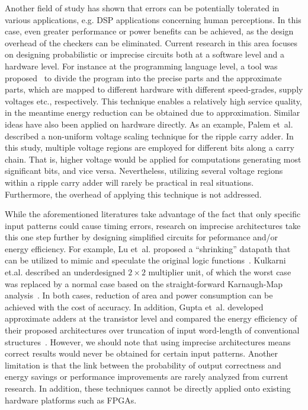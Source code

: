 \documentclass[prodmode,acmtrets]{acmsmall} %
\begin{document}
Another field of study has shown that errors can be potentially tolerated in various applications, e.g. DSP applications concerning human perceptions. In this case, even greater performance or power benefits can be achieved, as the design overhead of the checkers can be eliminated. Current research in this area focuses on designing probabilistic or imprecise circuits both at a software level and a hardware level. For instance at the programming language level, a tool was proposed~\cite{EnerJ2011Uwash,Truffle2012Uwash} to divide the program into the precise parts and the approximate parts, which are mapped to different hardware with different speed-grades, supply voltages etc., respectively. This technique enables a relatively high service quality, in the meantime energy reduction can be obtained due to approximation. Similar ideas have also been applied on hardware directly. As an example, Palem et~al.~\cite{NonUniformScaling} described a non-uniform voltage scaling technique for the ripple carry adder. In this study, multiple voltage regions are employed for different bits along a carry chain. That is, higher voltage would be applied for computations generating most significant bits, and vice versa. Nevertheless, utilizing several voltage regions within a ripple carry adder will rarely be practical in real situations. Furthermore, the overhead of applying this technique is not addressed.

While the aforementioned literatures take advantage of the fact that only specific input patterns could cause timing errors, research on imprecise architectures take this one step further by designing simplified circuits for peformance and/or energy efficiency. For example, Lu et~al. proposed a ``shrinking'' datapath that can be utilized to mimic and speculate the original logic functions~\cite{IntelSpeeding}. Kulkarni et.al. described an underdesigned $2\times2$ multiplier unit, of which the worst case was replaced by a normal case based on the straight-forward Karnaugh-Map analysis~\cite{Undersigned2x2multiplier}. In both cases, reduction of area and power consumption can be achieved with the cost of accuracy. In addition, Gupta et~al. developed approximate adders at the transistor level and compared the energy efficiency of their proposed architectures over truncation of input word-length of conventional structures~\cite{Gupta2013TransCADICS}. However, we should note that using imprecise architectures means correct results would never be obtained for certain input patterns. Another limitation is that the link between the probability of output correctness and energy savings or performance improvements are rarely analyzed from current research. In addition, these techniques cannot be directly applied onto existing hardware platforms such as FPGAs.
\end{document}
